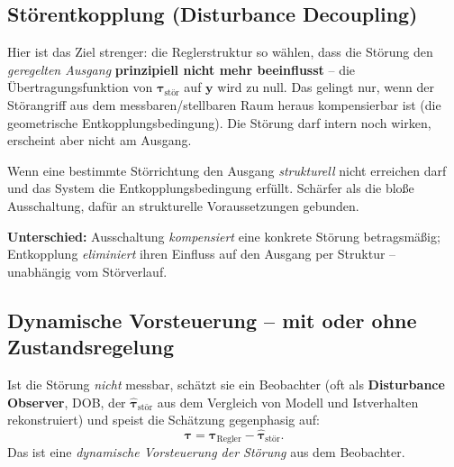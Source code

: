 \subsection{Störentkopplung (Disturbance Decoupling)}
Hier ist das Ziel strenger: die Reglerstruktur so wählen, dass die Störung den
\emph{geregelten Ausgang} \textbf{prinzipiell nicht mehr beeinflusst} -- die
Übertragungsfunktion von $\bm{\tau}_{\text{stör}}$ auf $\bm{y}$ wird zu null. Das
gelingt nur, wenn der Störangriff aus dem messbaren/stellbaren Raum heraus
kompensierbar ist (die geometrische Entkopplungsbedingung). Die Störung darf
intern noch wirken, erscheint aber nicht am Ausgang.
\begin{infobox}[title=Wann einsetzen]
Wenn eine bestimmte Störrichtung den Ausgang \emph{strukturell} nicht erreichen
darf und das System die Entkopplungsbedingung erfüllt. Schärfer als die bloße
Ausschaltung, dafür an strukturelle Voraussetzungen gebunden.
\end{infobox}
\textbf{Unterschied:} Ausschaltung \emph{kompensiert} eine konkrete Störung
betragsmäßig; Entkopplung \emph{eliminiert} ihren Einfluss auf den Ausgang per
Struktur -- unabhängig vom Störverlauf.

\subsection{Dynamische Vorsteuerung -- mit oder ohne Zustandsregelung}
Ist die Störung \emph{nicht} messbar, schätzt sie ein Beobachter (oft als
\textbf{Disturbance Observer}, DOB, der $\hat{\bm{\tau}}_{\text{stör}}$ aus dem
Vergleich von Modell und Istverhalten rekonstruiert) und speist die Schätzung
gegenphasig auf:
\begin{equation}
\bm{\tau} = \bm{\tau}_{\text{Regler}} - \hat{\bm{\tau}}_{\text{stör}}.
\end{equation}
Das ist eine \emph{dynamische Vorsteuerung der Störung} aus dem Beobachter.

